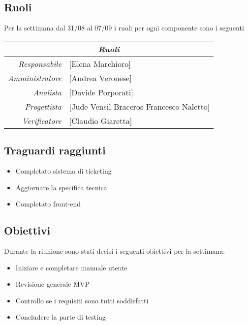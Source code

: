 \documentclass[12pt]{article}
\begin{document}
\subsection{Ruoli}
Per la settimana dal 31/08 al 07/09 i ruoli per ogni componente sono i seguenti
\\
\begin{tabular}{r | l}
    \multicolumn{2}{c}{\textit{Ruoli}}\\
    \hline
    \textit{Responsabile} &
    [Elena Marchioro]\makecell{}\\
    \textit{Amministratore} &
    [Andrea Veronese]\makecell{}\\
    \textit{Analista} &
    [Davide Porporati]\makecell{}\\
    \textit{Progettista} &
    [Jude Vensil Braceros Francesco Naletto]\makecell{}\\
    \textit{Verificatore} & 
    [Claudio Giaretta]\makecell{}\\
\end{tabular}

\subsection{Traguardi raggiunti}
\begin{itemize}
    \item Completato sistema di ticketing
    \item Aggiornare la specifica tecnica
    \item Completato front-end

\end{itemize}

\subsection{Obiettivi}
Durante la riunione sono stati decisi i seguenti obiettivi per la settimana:
\begin{itemize}
    \item Iniziare e completare manuale utente
    \item Revisione generale MVP
    \item Controllo se i requisiti sono tutti soddisfatti
    \item Concludere la parte di testing

\end{itemize}
\end{document}
